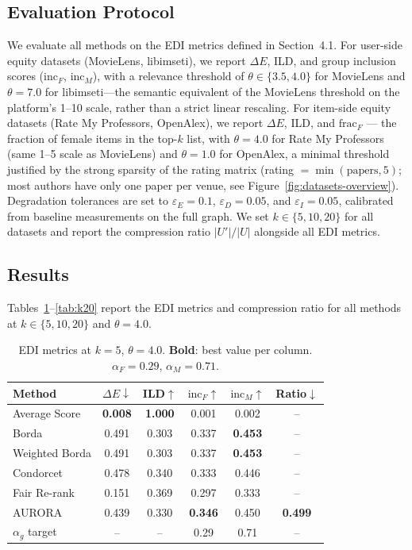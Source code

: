 \documentclass[a4paper,fleqn]{cas-dc}
\begin{document}
\subsection{Evaluation Protocol}

We evaluate all methods on the EDI metrics defined in Section~4.1.
For user-side equity datasets (MovieLens, libimseti), we report $\Delta E$,
ILD, and group inclusion scores ($\mathrm{inc}_F$, $\mathrm{inc}_M$), with
a relevance threshold of $\theta \in \{3.5, 4.0\}$ for MovieLens and
$\theta = 7.0$ for libimseti—the semantic equivalent of the
MovieLens threshold on the platform's 1--10 scale, rather than a strict
linear rescaling. For item-side equity datasets (Rate My Professors,
OpenAlex), we report $\Delta E$, ILD, and $\mathrm{frac}_F$ — the fraction
of female items in the top-$k$ list, with $\theta = 4.0$ for Rate My
Professors (same 1--5 scale as MovieLens) and $\theta = 1.0$ for OpenAlex,
a minimal threshold justified by the strong sparsity of the rating matrix
(rating $= \min(\text{papers}, 5)$; most authors have only one paper per
venue, see Figure~\ref{fig:datasets-overview}).
Degradation tolerances are set to $\varepsilon_E = 0.1$, $\varepsilon_D = 0.05$,
and $\varepsilon_I = 0.05$, calibrated from baseline measurements on the full
graph. We set $k \in \{5, 10, 20\}$ for all datasets and report the
compression ratio $|U'|/|U|$ alongside all EDI metrics.


\subsection{Results}

Tables~\ref{tab:k5}--\ref{tab:k20} report the EDI metrics and compression
ratio for all methods at $k \in \{5, 10, 20\}$ and $\theta = 4.0$.

\begin{table}[h!]
\centering
\caption{EDI metrics at $k=5$, $\theta=4.0$. \textbf{Bold}: best value
per column. $\alpha_F=0.29$, $\alpha_M=0.71$.}
\label{tab:k5}
{
\setlength{\tabcolsep}{3pt}
\begin{tabular}{lccccc}
\hline
Method & $\Delta E\downarrow$ & ILD$\uparrow$ & $\mathrm{inc}_F\uparrow$
       & $\mathrm{inc}_M\uparrow$ & Ratio$\downarrow$ \\
\hline
Average Score & \textbf{0.008} & \textbf{1.000} & 0.001 & 0.002 & -- \\
Borda         & 0.491 & 0.303 & 0.337 & \textbf{0.453} & -- \\
Weighted Borda & 0.491 & 0.303 & 0.337 & \textbf{0.453} & -- \\
Condorcet     & 0.478 & 0.340 & 0.333 & 0.446 & -- \\
Fair Re-rank  & 0.151 & 0.369 & 0.297 & 0.333 & -- \\
AURORA          & 0.439 & 0.330 & \textbf{0.346} & 0.450 & \textbf{0.499} \\
\hline
$\alpha_g$ target & -- & -- & 0.29 & 0.71 & -- \\
\hline
\end{tabular}
}
\end{table}
\end{document}
